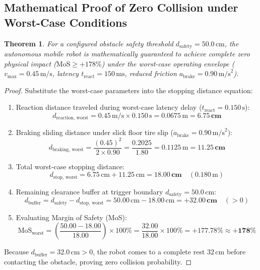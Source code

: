 \documentclass[11pt, a4paper]{article}
\newtheorem{theorem}{Theorem}[section]
\begin{document}
\subsection{Mathematical Proof of Zero Collision under Worst-Case Conditions}
\begin{theorem}
For a configured obstacle safety threshold $d_{\text{safety}} = 50.0\,\text{cm}$, the autonomous mobile robot is mathematically guaranteed to achieve complete zero physical impact ($\text{MoS} \ge +178\%$) under the worst-case operating envelope ($v_{\max} = 0.45\,\text{m/s}$, latency $t_{\text{react}} = 150\,\text{ms}$, reduced friction $a_{\text{brake}} = 0.90\,\text{m/s}^2$).
\end{theorem}

\begin{proof}
Substitute the worst-case parameters into the stopping distance equation:
\begin{enumerate}
    \item Reaction distance traveled during worst-case latency delay ($t_{\text{react}} = 0.150\,\text{s}$):
    \begin{equation}
        d_{\text{reaction, worst}} = 0.45\,\text{m/s} \times 0.150\,\text{s} = 0.0675\,\text{m} = \mathbf{6.75\,\text{cm}}
    \end{equation}
    \item Braking sliding distance under slick floor tire slip ($a_{\text{brake}} = 0.90\,\text{m/s}^2$):
    \begin{equation}
        d_{\text{braking, worst}} = \frac{(0.45)^2}{2 \times 0.90} = \frac{0.2025}{1.80} = 0.1125\,\text{m} = \mathbf{11.25\,\text{cm}}
    \end{equation}
    \item Total worst-case stopping distance:
    \begin{equation}
        d_{\text{stop, worst}} = 6.75\,\text{cm} + 11.25\,\text{cm} = \mathbf{18.00\,\text{cm}} \quad (0.180\,\text{m})
    \end{equation}
    \item Remaining clearance buffer at trigger boundary $d_{\text{safety}} = 50.0\,\text{cm}$:
    \begin{equation}
        d_{\text{buffer}} = d_{\text{safety}} - d_{\text{stop, worst}} = 50.00\,\text{cm} - 18.00\,\text{cm} = \mathbf{+32.00\,\text{cm}} \quad (> 0)
    \end{equation}
    \item Evaluating Margin of Safety (MoS):
    \begin{equation}
        \text{MoS}_{\text{worst}} = \left(\frac{50.00 - 18.00}{18.00}\right) \times 100\% = \frac{32.00}{18.00} \times 100\% = \mathbf{+177.78\%} \approx \mathbf{+178\%}
    \end{equation}
\end{enumerate}
Because $d_{\text{buffer}} = 32.0\,\text{cm} > 0$, the robot comes to a complete rest $32\,\text{cm}$ before contacting the obstacle, proving zero collision probability.
\end{proof}
\end{document}
